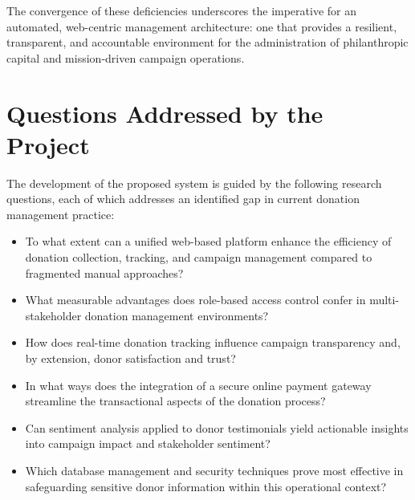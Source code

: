 \documentclass{thesis-library}
\begin{document}
The convergence of these deficiencies underscores the imperative for an automated, web-centric management architecture: one that provides a resilient, transparent, and accountable environment for the administration of philanthropic capital and mission-driven campaign operations.

\section{Questions Addressed by the Project}

The development of the proposed system is guided by the following research questions, each of which addresses an identified gap in current donation management practice:
\begin{itemize}
    \item To what extent can a unified web-based platform enhance the efficiency of donation collection, tracking, and campaign management compared to fragmented manual approaches?
    \item What measurable advantages does role-based access control confer in multi-stakeholder donation management environments?
    \item How does real-time donation tracking influence campaign transparency and, by extension, donor satisfaction and trust?
    \item In what ways does the integration of a secure online payment gateway streamline the transactional aspects of the donation process?
    \item Can sentiment analysis applied to donor testimonials yield actionable insights into campaign impact and stakeholder sentiment?
    \item Which database management and security techniques prove most effective in safeguarding sensitive donor information within this operational context?
\end{itemize}

\newpage
\end{document}
